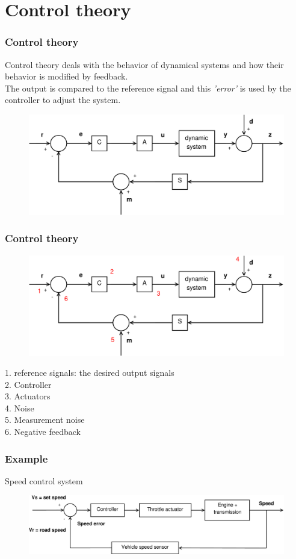 \section{Control theory}

\begin{frame}
	\frametitle{Control theory}
	Control theory deals with the behavior of dynamical systems and how their behavior is modified by feedback.\\
	The output is compared to the reference signal and this \textit{'error'} is used by the controller to adjust the system. 
	\medskip
	\begin{figure}
		\includegraphics[width=1\linewidth]{full_system1}
	\end{figure}
\end{frame}

\begin{frame}
	\frametitle{Control theory}
	\begin{figure}
		\includegraphics[width=.8\linewidth]{full_system2}
	\end{figure}
	\vspace{-2ex}
	1. reference signals: the desired output signals\\
	2. Controller\\
	3. Actuators\\
	4. Noise\\
	5. Measurement noise\\
	6. Negative feedback
\end{frame}

\begin{frame}
	\frametitle{Example}
	\vspace{-6ex}
	Speed control system\\
	\bigskip
	\bigskip
	\begin{figure}
		\includegraphics[width=1\linewidth]{speed_control_system}
	\end{figure}
\end{frame}


